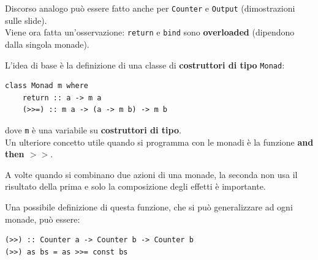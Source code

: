 \documentclass{article}
\begin{document}
Discorso analogo può essere fatto anche per \texttt{Counter} e \texttt{Output} (dimostrazioni sulle slide).\vspace{14pt}\\
Viene ora fatta un'osservazione: \texttt{return} e \texttt{bind} sono \textbf{overloaded} (dipendono dalla singola monade).

L'idea di base è la definizione di una classe di \textbf{costruttori di tipo} \texttt{Monad}:
\begin{tcolorbox}
\begin{verbatim}
class Monad m where
    return :: a -> m a
    (>>=) :: m a -> (a -> m b) -> m b
\end{verbatim}
\end{tcolorbox}
dove \texttt{m} è una variabile su \textbf{costruttori di tipo}.\vspace{14pt}\\
Un ulteriore concetto utile quando si programma con le monadi è la funzione \textbf{and then $>>$}.

A volte quando si combinano due azioni di una monade, la seconda non usa il risultato della prima e solo la composizione degli effetti è importante.

Una possibile definizione di questa funzione, che si può generalizzare ad ogni monade, può essere:
\begin{tcolorbox}
\begin{verbatim}
(>>) :: Counter a -> Counter b -> Counter b
(>>) as bs = as >>= const bs
\end{verbatim}
\end{tcolorbox}

\pagebreak
\end{document}
